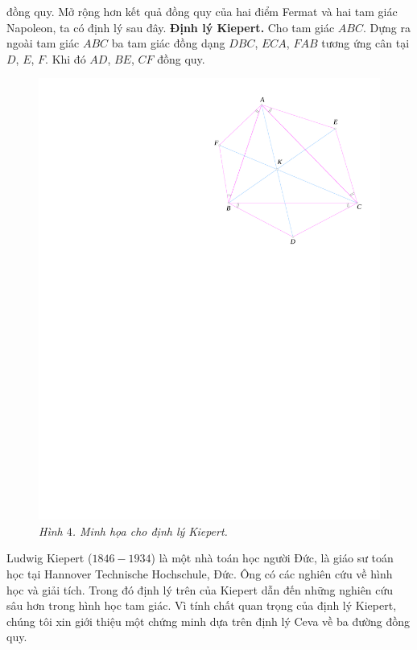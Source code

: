 \begin{multicols}{2}
	đồng quy.
	\vskip 0.1cm
	Mở rộng hơn kết quả đồng quy của hai điểm Fermat và hai tam giác Napoleon, ta có định lý sau đây.
	\vskip 0.1cm
	{\bf\color{cackithi} Định lý Kiepert.} Cho tam giác $ABC$. Dựng ra ngoài tam giác $ABC$ ba tam giác đồng dạng $DBC$, $ECA$, $FAB$ tương ứng cân tại $D$, $E$, $F$. Khi đó $AD$, $BE$, $CF$ đồng quy.
	\begin{figure}[H]
		\vspace*{-5pt}
		\centering
		\captionsetup{labelformat= empty, justification=centering}
		\includegraphics[width= 0.75\linewidth]{figure8056}
		\caption{\small\textit{\color{cackithi}Hình $4$. Minh họa cho định lý Kiepert.}}
		\vspace*{-10pt}
	\end{figure}
	Ludwig Kiepert ($1846-1934$) là một nhà toán học người Đức, là giáo sư toán học tại Hannover Technische Hochschule, Đức. Ông có các nghiên cứu về hình học và giải tích. Trong đó định lý trên của Kiepert dẫn đến những nghiên cứu sâu hơn trong hình học tam giác.
	\vskip 0.1cm
	Vì tính chất quan trọng của định lý Kiepert, chúng tôi xin giới thiệu một chứng minh dựa trên định lý Ceva về ba đường đồng quy.
	\begin{figure}[H]
		\vspace*{-5pt}
		\centering
		\captionsetup{labelformat= empty, justification=centering}

\end{figure}
\end{multicols}
